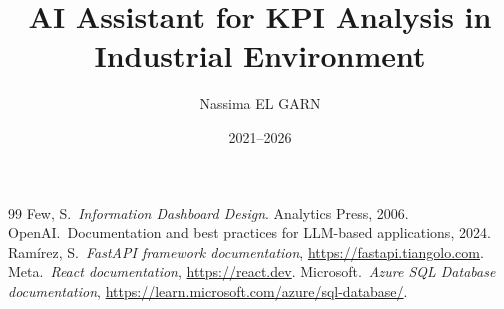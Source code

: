 \documentclass[12pt,a4paper,openany]{report}
\title{AI Assistant for KPI Analysis in Industrial Environment}
\author{Nassima EL GARN}
\date{2021--2026}
\begin{document}







\tableofcontents
\listoffigures
\listoftables

\newpage
{}









\begin{thebibliography}{99}
 Few, S.\ \emph{Information Dashboard Design}. Analytics Press, 2006.
 OpenAI.\ Documentation and best practices for LLM-based applications, 2024.
 Ramírez, S.\ \emph{FastAPI framework documentation}, \url{https://fastapi.tiangolo.com}.
 Meta.\ \emph{React documentation}, \url{https://react.dev}.
 Microsoft.\ \emph{Azure SQL Database documentation}, \url{https://learn.microsoft.com/azure/sql-database/}.
\end{thebibliography}
\end{document}
